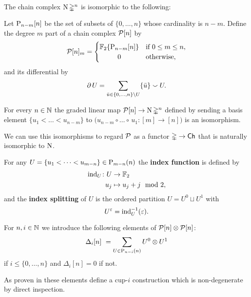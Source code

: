 \subsection{}

The chain complex $\chains \simplex^n$ is isomorphic to the following:

\begin{definition}
	Let $\P_{n-m}[n]$ be the set of subsets of $\{0, \dots, n\}$ whose cardinality is $n-m$.
	Define the degree $m$ part of a chain complex $\cP[n]$ by
	\[
	\cP[n]_m = \begin{cases}
	\F\{\P_{n-m}[n]\} & \text{if } 0 \leq m \leq n, \\
	\hfil 0 & \text{otherwise},
	\end{cases}
	\]
	and its differential by
	\[
	\bd U = \sum_{\bar u \in \{0, \dots, n\} \setminus U} \{\bar u\} \union U.
	\]
\end{definition}

\begin{lemma}
	For every $n \in \N$ the graded linear map $\cP[n] \to \chains \simplex^n$ defined by sending a basis element $\{u_1 < \dots < u_{n-m}\}$ to $\big( {u_{n-m}} \circ \dots \circ \, {u_1} \colon [m] \to [n] \big)$ is an isomorphism.
\end{lemma}

We can use this isomorphisms to regard $\cP$ as a functor $\simplex \to \Ch$ that is naturally isomorphic to $\chains$.

\begin{definition}
	For any $U = \{u_1 < \dots < u_{m-n}\} \in \P_{m-n}(n)$ the \textbf{index function} is defined by
	\[
	\begin{split}
	\ind_U \colon U &\to \F \\
	u_j &\mapsto u_j + j \mod 2,
	\end{split}
	\]
	and the \textbf{index splitting} of $U$ is the ordered partition $U = U^0 \sqcup U^1$ with
	\[
	U^\varepsilon = \ind_U^{-1}(\varepsilon).
	\]
\end{definition}

\begin{definition}
	For $n, i \in \N$ we introduce the following elements of $\cP[n] \ot \cP[n]$:
	\[
	\Delta_i [n] \ =
	\sum_{U \in \P_{n-i}(n)} {U^0} \ot {U^1}
	\]
	if $i \leq \{0, \dots, n\}$ and $\Delta_i [n] = 0$ if not.
\end{definition}

As proven in \cite{medina2021newformulas} these elements define a cup-$i$ construction which is non-degenerate by direct inspection.

